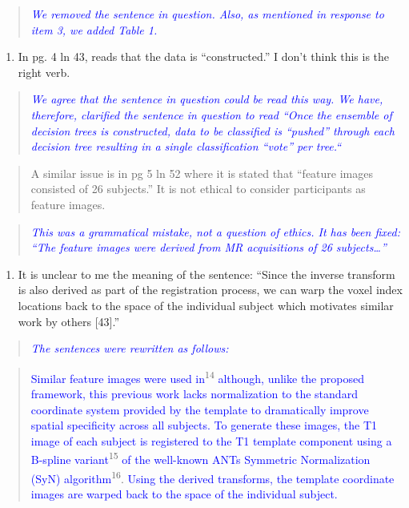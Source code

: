 \documentclass[12pt,]{article}
\providecommand{\tightlist}{%
  \setlength{\itemsep}{0pt}\setlength{\parskip}{0pt}}
\begin{document}
\begin{quote}
\emph{\textcolor{blue}{We removed the sentence in question.  Also, as mentioned in
response to item 3, we added Table 1.}}
\end{quote}

\begin{enumerate}
\def\labelenumi{\arabic{enumi}.}
\setcounter{enumi}{9}
\tightlist
\item
  In pg. 4 ln 43, reads that the data is ``constructed.'' I don't think
  this is the right verb.
\end{enumerate}

\begin{quote}
\emph{\textcolor{blue}{We agree that the sentence in question could be read this way.
We have, therefore, clarified the sentence in question to read
``Once the ensemble of decision trees is constructed, data to be classified is ``pushed''
through each decision tree resulting in a single classification ``vote'' per tree.``}}
\end{quote}

\begin{quote}
A similar issue is in pg 5 ln 52 where it is stated that ``feature
images consisted of 26 subjects.'' It is not ethical to consider
participants as feature images.
\end{quote}

\begin{quote}
\emph{\textcolor{blue}{This was a grammatical mistake, not a question of
ethics.  It has been fixed: ``The feature images
were derived from MR acquisitions of 26 subjects\ldots''}}
\end{quote}

\begin{enumerate}
\def\labelenumi{\arabic{enumi}.}
\setcounter{enumi}{10}
\tightlist
\item
  It is unclear to me the meaning of the sentence: ``Since the inverse
  transform is also derived as part of the registration process, we can
  warp the voxel index locations back to the space of the individual
  subject which motivates similar work by others {[}43{]}.''
\end{enumerate}

\begin{quote}
\emph{\textcolor{blue}{The sentences were rewritten as follows:}}
\end{quote}

\begin{quote}
\textcolor{blue}{Similar feature images were used in}\textsuperscript{14}
\textcolor{blue}{although, unlike the proposed framework, this previous work lacks
normalization to the standard
coordinate system provided by the template to dramatically improve spatial specificity
across all subjects.  To generate these images, the T1 image of each subject is
registered to the T1 template component using a B-spline variant}\textsuperscript{15}
\textcolor{blue}{of the well-known ANTs Symmetric Normalization (SyN) algorithm}\textsuperscript{16}.
\textcolor{blue}{Using the derived transforms, the template coordinate images are warped back to the space of the individual subject.}
\end{quote}
\end{document}
